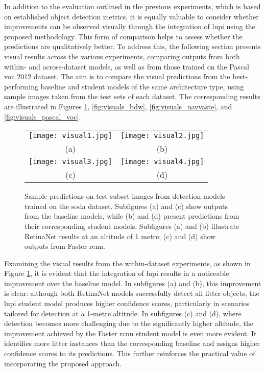 In addition to the evaluation outlined in the previous experiments, which is based on established object detection metrics, it is equally valuable to consider whether improvements can be observed visually through the integration of \gls{lupi} using the proposed methodology. This form of comparison helps to assess whether the predictions are qualitatively better. To address this, the following section presents visual results across the various experiments, comparing outputs from both within- and across-dataset models, as well as from those trained on the Pascal \gls{voc} 2012 dataset. The aim is to compare the visual predictions from the best-performing baseline and student models of the same architecture type, using sample images taken from the test sets of each dataset. The corresponding results are illustrated in Figures \ref{fig:visuals_soda}, \ref{fig:visuals_bdw}, \ref{fig:visuals_uavvaste}, and \ref{fig:visuals_pascal_voc}.

\begin{figure}[!ht]
  \centering
  \begin{tabular}{cc}
    \texttt{[image: visual1.jpg]} &
    \texttt{[image: visual2.jpg]} \\
    \small (a) & \small (b) \\
    \addlinespace[1em]
    \texttt{[image: visual3.jpg]} &
    \texttt{[image: visual4.jpg]} \\
    \small (c) & \small (d) \\
  \end{tabular}
  \caption{Sample predictions on test subset images from detection models trained on the \gls{soda} dataset. Subfigures (a) and (c) show outputs from the baseline models, while (b) and (d) present predictions from their corresponding student models. Subfigures (a) and (b) illustrate RetinaNet results at an altitude of 1 metre; (c) and (d) show outputs from Faster \gls{rcnn}.}
  \label{fig:visuals_soda}
\end{figure}

Examining the visual results from the within-dataset experiments, as shown in Figure \ref{fig:visuals_soda}, it is evident that the integration of \gls{lupi} results in a noticeable improvement over the baseline model. In subfigures (a) and (b), this improvement is clear: although both RetinaNet models successfully detect all litter objects, the \gls{lupi} student model produces higher confidence scores, particularly in scenarios tailored for detection at a 1-metre altitude.
In subfigures (c) and (d), where detection becomes more challenging due to the significantly higher altitude, the improvement achieved by the Faster \gls{rcnn} student model is even more evident. It identifies more litter instances than the corresponding baseline and assigns higher confidence scores to its predictions. This further reinforces the practical value of incorporating the proposed approach.

